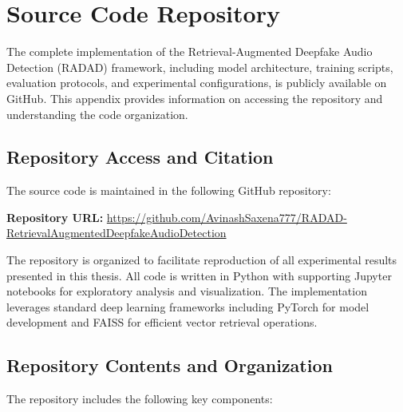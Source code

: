 \newpage



\section{Source Code Repository}\label{apx:github_repo}

The complete implementation of the Retrieval-Augmented Deepfake Audio Detection (RADAD) framework, including model architecture, training scripts, evaluation protocols, and experimental configurations, is publicly available on GitHub. This appendix provides information on accessing the repository and understanding the code organization.

\subsection{Repository Access and Citation}\label{apx:github_repo:access}

The source code is maintained in the following GitHub repository:

\textbf{Repository URL:} \url{https://github.com/AvinashSaxena777/RADAD-RetrievalAugmentedDeepfakeAudioDetection}


The repository is organized to facilitate reproduction of all experimental results presented in this thesis. All code is written in Python with supporting Jupyter notebooks for exploratory analysis and visualization. The implementation leverages standard deep learning frameworks including PyTorch for model development and FAISS for efficient vector retrieval operations.

\subsection{Repository Contents and Organization}\label{apx:github_repo:contents}

The repository includes the following key components:

